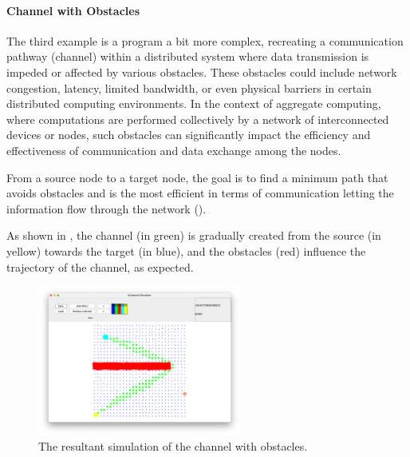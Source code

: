 \clearpage
\paragraph{Channel with Obstacles}
The third example is a program a bit more complex, recreating a communication pathway (channel) within a distributed
system where data transmission is impeded or affected by various obstacles.
These obstacles could include network congestion, latency, limited bandwidth, or even physical barriers in certain
distributed computing environments.
In the context of aggregate computing, where computations are performed collectively by a network of interconnected
devices or nodes, such obstacles can significantly impact the efficiency and effectiveness of communication and data exchange among the nodes.

From a source node to a target node, the goal is to find a minimum path that avoids obstacles and is the most efficient
in terms of communication letting the information flow through the network ().

As shown in , the channel (in green) is gradually created from the source (in yellow) towards the
target (in blue), and the obstacles (red) influence the trajectory of the channel, as expected.

\begin{figure}
    \centering
    \includegraphics[width=0.6\textwidth]{figures/channel}
    \caption{The resultant simulation of the channel with obstacles.}
    \label{fig:channel}
\end{figure}

